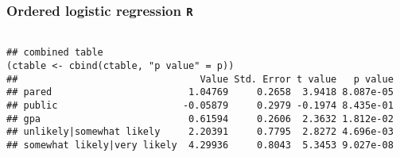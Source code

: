 \documentclass[00-GLMregslides.tex]{subfiles}
\begin{document}
\begin{frame}[fragile]
	\frametitle{Ordered logistic regression \texttt{R} }
	\Large
\begin{framed}		
	\begin{verbatim}
		
## combined table
(ctable <- cbind(ctable, "p value" = p))
##                                Value Std. Error t value   p value
## pared                        1.04769     0.2658  3.9418 8.087e-05
## public                      -0.05879     0.2979 -0.1974 8.435e-01
## gpa                          0.61594     0.2606  2.3632 1.812e-02
## unlikely|somewhat likely     2.20391     0.7795  2.8272 4.696e-03
## somewhat likely|very likely  4.29936     0.8043  5.3453 9.027e-08
\end{verbatim}
\end{framed}
\end{frame}
\end{document}
